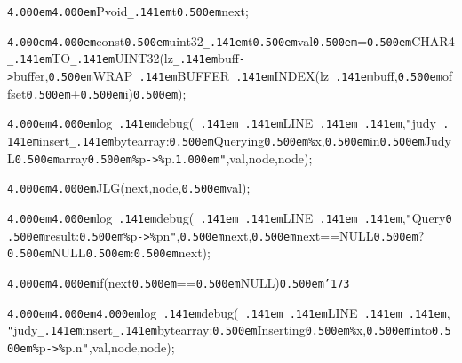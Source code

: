 \noindent
{}{\tt\mc \kern4.000em}{\tt\mc \kern4.000em}Pvoid{\tt\_\kern.141em}t{\tt *}{\tt\mc \kern0.500em}next;

\noindent
{}{\tt\mc \kern4.000em}{\tt\mc \kern4.000em}const{\tt\mc \kern0.500em}uint32{\tt\_\kern.141em}t{\tt\mc \kern0.500em}val{\tt\mc \kern0.500em}={\tt\mc \kern0.500em}CHAR4{\tt\_\kern.141em}TO{\tt\_\kern.141em}UINT32(lz{\tt\_\kern.141em}buff{\tt -}{\tt >}buffer,{\tt\mc \kern0.500em}WRAP{\tt\_\kern.141em}BUFFER{\tt\_\kern.141em}INDEX(lz{\tt\_\kern.141em}buff,{\tt\mc \kern0.500em}offset{\tt\mc \kern0.500em}+{\tt\mc \kern0.500em}i){\tt\mc \kern0.500em});

\noindent
{}\hfill

\noindent
{}{\tt\mc \kern4.000em}{\tt\mc \kern4.000em}log{\tt\_\kern.141em}debug({\tt\_\kern.141em}{\tt\_\kern.141em}LINE{\tt\_\kern.141em}{\tt\_\kern.141em},{\tt "}judy{\tt\_\kern.141em}insert{\tt\_\kern.141em}bytearray:{\tt\mc \kern0.500em}Querying{\tt\mc \kern0.500em}{\tt\%}x,{\tt\mc \kern0.500em}in{\tt\mc \kern0.500em}JudyL{\tt\mc \kern0.500em}array{\tt\mc \kern0.500em}{\tt\%}p{\tt -}{\tt >}{\tt\%}p.{\tt\mc \kern1.000em}{\tt "},val,node,{\tt *}node);

\noindent
{}\hfill

\noindent
{}{\tt\mc \kern4.000em}{\tt\mc \kern4.000em}JLG(next,{\tt *}node,{\tt\mc \kern0.500em}val);

\noindent
{}\hfill

\noindent
{}{\tt\mc \kern4.000em}{\tt\mc \kern4.000em}log{\tt\_\kern.141em}debug({\tt\_\kern.141em}{\tt\_\kern.141em}LINE{\tt\_\kern.141em}{\tt\_\kern.141em},{\tt "}Query{\tt\mc \kern0.500em}result:{\tt\mc \kern0.500em}{\tt\%}p{\tt -}{\tt >}{\tt\%}p{\tt{}}n{\tt "},{\tt\mc \kern0.500em}next,{\tt\mc \kern0.500em}next==NULL{\tt\mc \kern0.500em}?{\tt\mc \kern0.500em}NULL{\tt\mc \kern0.500em}:{\tt\mc \kern0.500em}{\tt *}next);

\noindent
{}\hfill

\noindent
{}{\tt\mc \kern4.000em}{\tt\mc \kern4.000em}if(next{\tt\mc \kern0.500em}=={\tt\mc \kern0.500em}NULL){\tt\mc \kern0.500em}{\tt\char'173}

\noindent
{}{\tt\mc \kern4.000em}{\tt\mc \kern4.000em}{\tt\mc \kern4.000em}log{\tt\_\kern.141em}debug({\tt\_\kern.141em}{\tt\_\kern.141em}LINE{\tt\_\kern.141em}{\tt\_\kern.141em},{\tt "}judy{\tt\_\kern.141em}insert{\tt\_\kern.141em}bytearray:{\tt\mc \kern0.500em}Inserting{\tt\mc \kern0.500em}{\tt\%}x,{\tt\mc \kern0.500em}into{\tt\mc \kern0.500em}{\tt\%}p{\tt -}{\tt >}{\tt\%}p.{\tt{}}n{\tt "},val,node,{\tt *}node);

